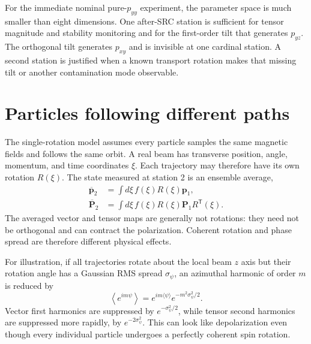 \documentclass[11pt,a4paper]{article}
\newcommand{\vect}[1]{\bm{#1}}
\newcommand{\Tens}{\bm P}
\begin{document}
For the immediate nominal pure-$p_{yy}$ experiment, the parameter space is much
smaller than eight dimensions.  One after-SRC station is sufficient for tensor
magnitude and stability monitoring and for the first-order tilt that generates
$p_{yz}$.  The orthogonal tilt generates $p_{xy}$ and is invisible at one
cardinal station.  A second station is justified when a known transport rotation
makes that missing tilt or another contamination mode observable.

\section{Particles following different paths}

The single-rotation model assumes every particle samples the same magnetic fields
and follows the same orbit.  A real beam has transverse position, angle, momentum,
and time coordinates $\xi$.  Each trajectory may therefore have its own rotation
$R(\xi)$.  The state measured at station 2 is an ensemble average,
\begin{align}
 \overline{\vect p}_2
 &=\int d\xi\,f(\xi)R(\xi)\vect p_1,\\
 \overline{\Tens}_2
 &=\int d\xi\,f(\xi)R(\xi)\Tens_1R^{\mathsf T}(\xi).
 \label{eq:ensemble-transport}
\end{align}
The averaged vector and tensor maps are generally not rotations: they need not be
orthogonal and can contract the polarization.  Coherent rotation and phase spread
are therefore different physical effects.

For illustration, if all trajectories rotate about the local beam $z$ axis but
their rotation angle has a Gaussian RMS spread $\sigma_\psi$, an azimuthal harmonic of order $m$
is reduced by
\begin{equation}
 \left\langle e^{im\psi}\right\rangle
 =e^{im\langle\psi\rangle}e^{-m^2\sigma_\psi^2/2}.
\end{equation}
Vector first harmonics are suppressed by $e^{-\sigma_\psi^2/2}$, while tensor
second harmonics are suppressed more rapidly, by $e^{-2\sigma_\psi^2}$.  This can
look like depolarization even though every individual particle undergoes a
perfectly coherent spin rotation.
\end{document}
